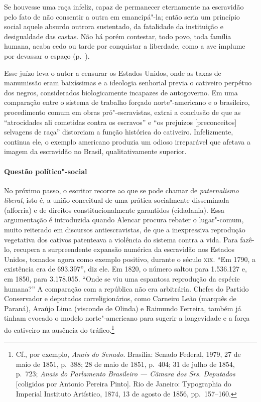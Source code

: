 \begin{hedraquote}
Se houvesse uma raça infeliz, capaz de permanecer eternamente na
escravidão pelo fato de não consentir a outra em emancipá"-la; então
seria um princípio social aquele absurdo outrora sustentado, da
fatalidade da instituição e desigualdade das castas. Não há porém
contestar, todo povo, toda família humana, acaba cedo ou tarde por
conquistar a liberdade, como a ave implume por devassar o espaço 
(p.~\pageref{implume}). 
\end{hedraquote}

Esse juízo leva o autor a censurar os Estados Unidos, onde as taxas de
manumissão eram baixíssimas e a ideologia senhorial previa o cativeiro
perpétuo dos negros, considerados biologicamente incapazes de
autogoverno. Em uma comparação entre o sistema de trabalho forçado
norte"-americano e o brasileiro, procedimento comum em obras
pró"-escravistas, extrai a conclusão de que as ``atrocidades ali
cometidas contra os escravos'' e ``os prejuízos [preconceitos] selvagens
de raça'' distorciam a função histórica do cativeiro. Infelizmente,
continua ele, o exemplo americano produzia um odioso irreparável que
afetava a imagem da escravidão no Brasil, qualitativamente superior.  

\paragraph{Questão político"-social} No próximo passo, o escritor recorre
ao que se pode chamar de \textit{paternalismo liberal}, isto é, a união conceitual
de uma prática socialmente disseminada (alforria) e de direitos 
constitucionalmente garantidos (cidadania). Essa argumentação é 
introduzida quando Alencar procura rebater o lugar"-comum, muito reiterado 
em discursos antiescravistas, de que a inexpressiva reprodução vegetativa 
dos cativos patenteava a violência do sistema contra a vida. Para fazê-lo, 
recupera a surpreendente expansão numérica da escravidão nos Estados Unidos,
tomados agora como exemplo positivo, durante o século \textsc{xix}. “Em 1790, 
a existência era de 693.397”, diz ele. Em 1820, o número saltou para 1.536.127 
e, em 1850, para 3.178.055. “Onde se viu uma espantosa reprodução da espécie 
humana?” A comparação com a república não era arbitrária. Chefes do Partido 
Conservador e deputados correligionários, como Carneiro Leão (marquês de Paraná), 
Araújo Lima (visconde de Olinda) e Raimundo Ferreira, também já tinham 
evocado o modelo norte"-americano para sugerir a longevidade e a força do 
cativeiro na ausência do tráfico.\footnote{ Cf., por exemplo,
\textit{Anais do Senado}. Brasília: Senado Federal, 1979, 
27 de maio de 1851, p.~388; 28 de maio de 1851, p.~404; 31 de julho de 1854, 
p.~723; \textit{Anais do Parlamento Brasileiro --- Câmara dos Srs. Deputados} [coligidos por
Antonio Pereira Pinto]. Rio de Janeiro: Typographia do Imperial
Instituto Artístico, 1874, 13 de agosto de 1856, pp.~157--160.} 

